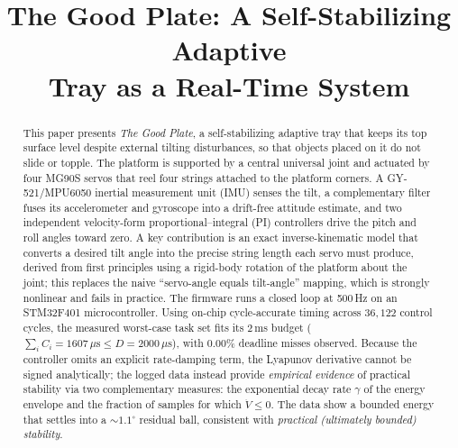 \documentclass[conference]{IEEEtran}
\begin{document}
\title{The Good Plate: A Self-Stabilizing Adaptive\\
  Tray as a Real-Time System}

\author{
\and
{}
\and
{}
}

\maketitle

\begin{abstract}
  This paper presents \emph{The Good Plate}, a self-stabilizing adaptive tray that keeps
  its top surface level despite external tilting disturbances, so that objects
  placed on it do not slide or topple. The platform is supported by a central
  universal joint and actuated by four MG90S servos that reel four strings
  attached to the platform corners. A GY-521/MPU6050 inertial measurement unit
  (IMU) senses the tilt, a complementary filter fuses its accelerometer and
  gyroscope into a drift-free attitude estimate, and two independent
  velocity-form proportional--integral (PI) controllers drive the pitch and roll
  angles toward zero. A key contribution is an exact inverse-kinematic model that
  converts a desired tilt angle into the precise string length each servo must
  produce, derived from first principles using a rigid-body rotation of the
  platform about the joint; this replaces the naive ``servo-angle equals
  tilt-angle'' mapping, which is strongly nonlinear and fails in practice. The
  firmware runs a closed loop at \mbox{500\,Hz} on an STM32F401 microcontroller.
  Using on-chip cycle-accurate timing across $36{,}122$ control cycles, the
  measured worst-case task set fits its $2\,$ms budget
  ($\sum_i C_i = 1607\,\mu\text{s} \le D = 2000\,\mu\text{s}$), with
  \mbox{0.00\%} deadline misses observed. Because the controller
  omits an explicit rate-damping term, the Lyapunov derivative cannot be signed
  analytically; the logged data instead provide \emph{empirical evidence} of
  practical stability via two complementary measures: the exponential decay
  rate $\gamma$ of the energy envelope and the fraction of samples for which
  $\dot V \le 0$. The data show a bounded energy that settles into a
  $\sim\!1.1^\circ$ residual ball, consistent with \emph{practical (ultimately
    bounded) stability}.
\end{abstract}
\end{document}
